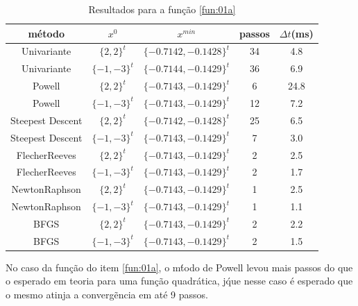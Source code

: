 \documentclass[10pt, a4paper]{article}
\begin{document}
\begin{table}[H]
      \small
      \centering
      \caption{Resultados para a fun\c c\~ao \ref{fun:01a}}
      \begin{tabular}{c|c|c|c|c}
            m\'etodo           & $x^0$ & $x^{min}$ & passos & $\Delta t$(ms) \\
            \hline
            Univariante         & $\{2,2\}^t$     & $\{-0.7142,-0.1428\}^t$  & 34 & 4.8 \\
            Univariante         & $\{-1,-3\}^t$   & $\{-0.7144,-0.1429\}^t$  & 36 & 6.9 \\
            Powell              & $\{2,2\}^t$     & $\{-0.7143,-0.1429\}^t$  &  6 & 24.8 \\
            Powell              & $\{-1,-3\}^t$   & $\{-0.7143,-0.1429\}^t$  & 12 & 7.2 \\
            Steepest Descent    & $\{2,2\}^t$     & $\{-0.7142,-0.1428\}^t$  & 25 & 6.5 \\
            Steepest Descent    & $\{-1,-3\}^t$   & $\{-0.7143,-0.1429\}^t$  &  7 & 3.0 \\
            Flecher\-Reeves     & $\{2,2\}^t$     & $\{-0.7143,-0.1429\}^t$  &  2 & 2.5 \\
            Flecher\-Reeves     & $\{-1,-3\}^t$   & $\{-0.7143,-0.1429\}^t$  &  2 & 1.7 \\
            Newton\-Raphson     & $\{2,2\}^t$     & $\{-0.7143,-0.1429\}^t$  &  1 & 2.5 \\
            Newton\-Raphson     & $\{-1,-3\}^t$   & $\{-0.7143,-0.1429\}^t$  &  1 & 1.1 \\
            BFGS                & $\{2,2\}^t$     & $\{-0.7143,-0.1429\}^t$  &  2 & 2.2 \\
            BFGS                & $\{-1,-3\}^t$   & $\{-0.7143,-0.1429\}^t$  &  2 & 1.5 \\
     \end{tabular}
      \label{table:resultadosf1a}
\end{table}

No caso da fun\c c\~ao do item \ref{fun:01a}, o m\'todo de Powell levou mais passos do que o esperado em teoria para uma fun\c c\~ao quadr\'atica, j\' que nesse caso \'e esperado que o mesmo atinja a converg\~encia em at\'e 9 passos.
\end{document}
